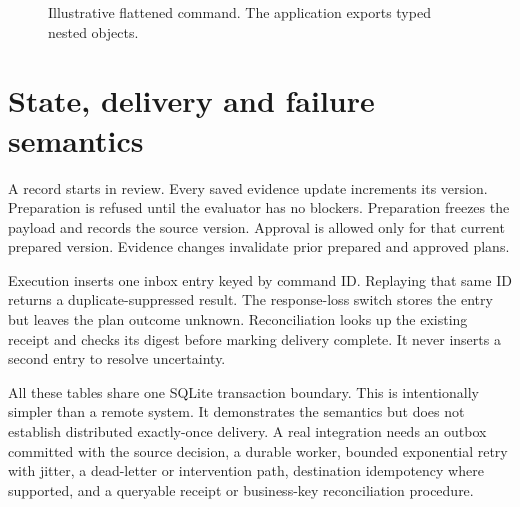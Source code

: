 \documentclass[11pt,letterpaper]{article}
\begin{document}
\begin{figure}[htbp]
{%

}
\caption{Illustrative flattened command. The application exports typed nested objects.}
\end{figure}

\section{State, delivery and failure semantics}
A record starts in review. Every saved evidence update increments its version. Preparation is refused until the evaluator has no blockers. Preparation freezes the payload and records the source version. Approval is allowed only for that current prepared version. Evidence changes invalidate prior prepared and approved plans.

Execution inserts one inbox entry keyed by command ID. Replaying that same ID returns a duplicate-suppressed result. The response-loss switch stores the entry but leaves the plan outcome unknown. Reconciliation looks up the existing receipt and checks its digest before marking delivery complete. It never inserts a second entry to resolve uncertainty.

All these tables share one SQLite transaction boundary. This is intentionally simpler than a remote system. It demonstrates the semantics but does not establish distributed exactly-once delivery. A real integration needs an outbox committed with the source decision, a durable worker, bounded exponential retry with jitter, a dead-letter or intervention path, destination idempotency where supported, and a queryable receipt or business-key reconciliation procedure.
\end{document}
